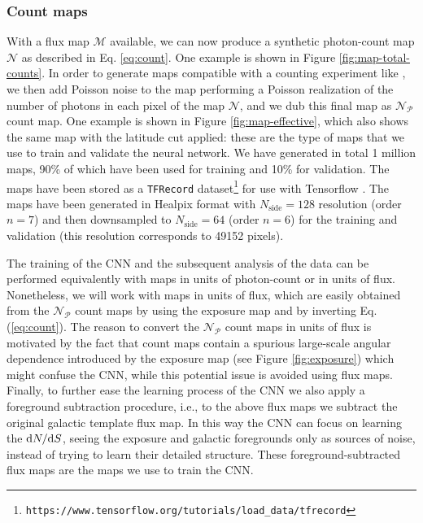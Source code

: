 \subsubsection{Count maps}

With a flux map $\mathcal{M}$ available, we can now produce a synthetic photon-count map $\mathcal{N}$ as described in Eq. \ref{eq:count}. 
One example is shown in Figure \ref{fig:map-total-counts}. 
In order to generate maps compatible with a counting experiment like \fermi, we then add Poisson noise to the map performing a Poisson realization of the number of photons in each pixel of the map $\mathcal{N}$, and we dub this final map as $\mathcal{N}_\mathcal{P}$ count map. One example is shown in Figure \ref{fig:map-effective}, which also shows the same map with the latitude cut applied: these are the type of maps that we use to train and validate the neural network. We have generated in total 1 million maps, 90\% of which have been used for training and 10\% for validation. The maps have been stored as a \verb|TFRecord| dataset\footnote{\texttt{https://www.tensorflow.org/tutorials/load\_data/tfrecord}} for use with Tensorflow \cite{tensorflow2015-whitepaper}. The maps have been generated in Healpix format with $N_\textrm{side} = 128$ resolution (order $n=7$) and then downsampled to $N_\textrm{side} = 64$ (order $n=6$) for the training and validation (this resolution corresponds to 49152 pixels). 

The training of the CNN and the subsequent analysis of the \fermi data can be performed equivalently with maps in units of photon-count or in units of flux. Nonetheless, we will work with maps in units of flux, which are easily obtained from the $\mathcal{N}_\mathcal{P}$ count maps by using the exposure map and by inverting Eq. (\ref{eq:count}).  The reason to convert the $\mathcal{N}_\mathcal{P}$ count maps in units of flux is motivated by the fact that 
count maps contain a spurious large-scale angular dependence
introduced by the exposure map (see Figure \ref{fig:exposure}) which
might confuse the CNN, while this potential issue is avoided
using flux maps.
Finally, to further ease the learning process of the CNN
we also apply a foreground subtraction procedure,
i.e., to the above flux maps we subtract the original
galactic template flux map.
In this way the CNN can focus on learning the $\text{d}N/\text{d}S$, seeing the exposure and galactic foregrounds only as sources of noise, instead of trying to learn their detailed structure. These foreground-subtracted flux maps are the maps we use to train the CNN. 

